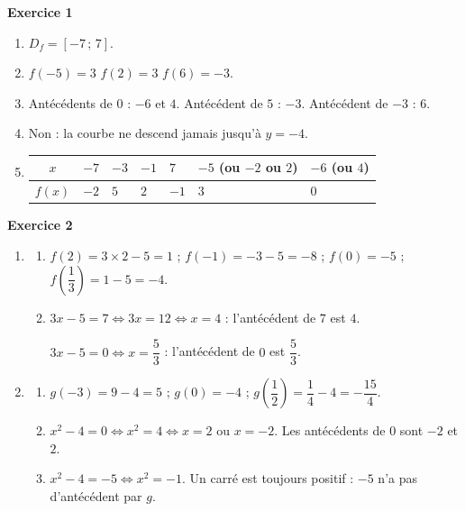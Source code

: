 \documentclass[a4paper,11pt]{article}
\newenvironment{exercice}[1]{%
  \Needspace{6\baselineskip}\par\bigskip\noindent\textbf{Exercice #1}\par\smallskip\noindent\ignorespaces
}{%
  \par
}
\begin{document}
\pagestyle{fancy}

\fancyhf{} %
\fancyhead[L]{ {\Niveau}}
\fancyhead[C]{ {\Chapitre}}
\fancyhead[R]{ {\Document}}
\fancyfoot[R]{{\thepage\  / \pageref{LastPage}}}

\begin{exercice}{1}
\begin{enumerate}[label=\arabic*.]
  \item $D_f = [-7\,;\,7]$.
  \item $f(-5) = 3$ \quad $f(2) = 3$ \quad $f(6) = -3$.
  \item Antécédents de $0$ : $-6$ et $4$. \quad Antécédent de $5$ : $-3$. \quad Antécédent de $-3$ : $6$.
  \item Non : la courbe ne descend jamais jusqu'à $y = -4$.
  \item
  \renewcommand{\arraystretch}{1.5}
  \begin{tabular}{|c|*{6}{C{1.3cm}|}}
    \hline
    $x$ & $-7$ & $-3$ & $-1$ & $7$ & $-5$ (ou $-2$ ou $2$) & $-6$ (ou $4$) \\ \hline
    $f(x)$ & $-2$ & $5$ & $2$ & $-1$ & $3$ & $0$ \\ \hline
  \end{tabular}
\end{enumerate}
\end{exercice}

\begin{exercice}{2}
\begin{enumerate}[label=\arabic*.]
  \item \begin{enumerate}[label=\alph*.]
    \item $f(2) = 3 \times 2 - 5 = 1$ ; \quad $f(-1) = -3 - 5 = -8$ ; \quad $f(0) = -5$ ; \quad $f\left(\dfrac{1}{3}\right) = 1 - 5 = -4$.
    \item $3x - 5 = 7 \iff 3x = 12 \iff x = 4$ : l'antécédent de $7$ est $4$.

    $3x - 5 = 0 \iff x = \dfrac{5}{3}$ : l'antécédent de $0$ est $\dfrac{5}{3}$.
  \end{enumerate}
  \item \begin{enumerate}[label=\alph*.]
    \item $g(-3) = 9 - 4 = 5$ ; \quad $g(0) = -4$ ; \quad $g\left(\dfrac{1}{2}\right) = \dfrac{1}{4} - 4 = -\dfrac{15}{4}$.
    \item $x^2 - 4 = 0 \iff x^2 = 4 \iff x = 2$ ou $x = -2$. Les antécédents de $0$ sont $-2$ et $2$.
    \item $x^2 - 4 = -5 \iff x^2 = -1$. Un carré est toujours positif : $-5$ n'a pas d'antécédent par $g$.
  \end{enumerate}
\end{enumerate}
\end{exercice}
\end{document}
